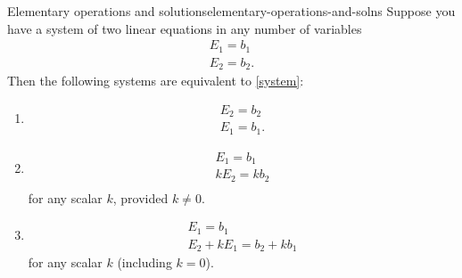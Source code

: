 \begin{theorem}{Elementary operations and solutions}{elementary-operations-and-solns}
Suppose you have a system of two linear equations in any number of variables
\begin{equation}
 \begin{array}{c}
  E_{1}=b_{1}\\
  E_{2}=b_{2}.
\end{array} \label{system}
\end{equation}
Then the following systems are equivalent to \eqref{system}: 
\begin{enumerate}
\item   \begin{equation}
	\begin{array}{c}
	E_{2}=b_{2}\\
	E_{1}=b_{1}.
	\end{array}
	\label{thm1.9.1}
	\end{equation}
\item  \begin{equation}
	\begin{array}{c}
	E_{1}=b_{1} \\
	kE_{2}=kb_{2}\\        
	\end{array}
	\label{thm1.9.2}
	\end{equation}
  for any scalar $k$, provided $k\neq0$.
\item \begin{equation}
      \begin{array}{c}
       E_{1}=b_{1} \\
       E_{2}+kE_{1}=b_{2}+kb_{1}
       \end{array}  
	\label{thm1.9.3}
	\end{equation}
	for any scalar $k$ (including $k=0$).

\end{enumerate}
\end{theorem}

